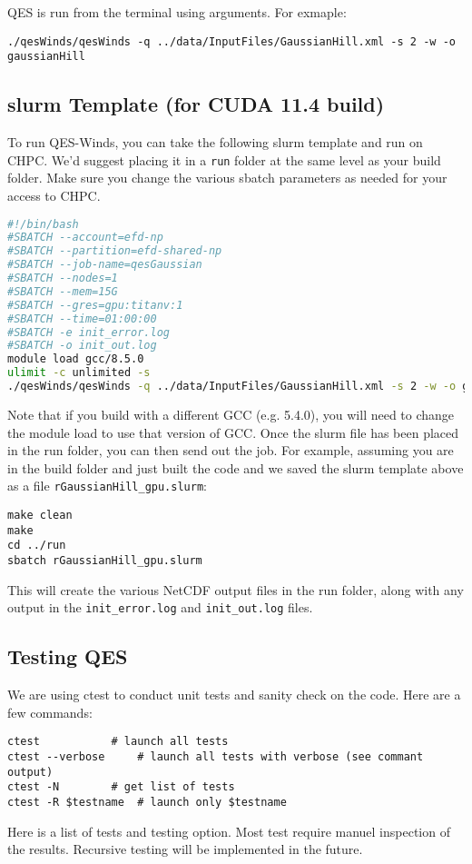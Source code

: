 QES is run from the terminal using arguments. For exmaple:
\begin{verbatim}
./qesWinds/qesWinds -q ../data/InputFiles/GaussianHill.xml -s 2 -w -o gaussianHill
\end{verbatim}


\subsection{slurm Template (for CUDA 11.4 build)}
To run QES-Winds, you can take the following slurm template and run on CHPC.  We'd suggest placing it in a \verb|run| folder at the same level as your build folder.  Make sure you change the various sbatch parameters as needed for your access to CHPC.

\begin{lstlisting}[language=bash]
#!/bin/bash
#SBATCH --account=efd-np
#SBATCH --partition=efd-shared-np
#SBATCH --job-name=qesGaussian
#SBATCH --nodes=1
#SBATCH --mem=15G
#SBATCH --gres=gpu:titanv:1
#SBATCH --time=01:00:00
#SBATCH -e init_error.log
#SBATCH -o init_out.log
module load gcc/8.5.0
ulimit -c unlimited -s
./qesWinds/qesWinds -q ../data/InputFiles/GaussianHill.xml -s 2 -w -o gaussianHill
\end{lstlisting}

Note that if you build with a different GCC (e.g. 5.4.0), you will need to change the module load to use that version of GCC. Once the slurm file has been placed in the run folder, you can then send out the job.  For example, assuming you are in the build folder and just built the code and we saved the slurm template above as a file \verb|rGaussianHill_gpu.slurm|:

\begin{verbatim}
make clean
make
cd ../run
sbatch rGaussianHill_gpu.slurm
\end{verbatim}

This will create the various NetCDF output files in the run folder, along with any output in the \verb|init_error.log| and \verb|init_out.log| files.


\subsection{Testing QES}

We are using ctest to conduct unit tests and sanity check on the code. Here are a few commands:
\begin{verbatim}
ctest			# launch all tests
ctest --verbose		# launch all tests with verbose (see commant output)
ctest -N		# get list of tests
ctest -R $testname	# launch only $testname
\end{verbatim}
Here is a list of tests and testing option. Most test require manuel inspection of the results. Recursive testing will be implemented in the future.

